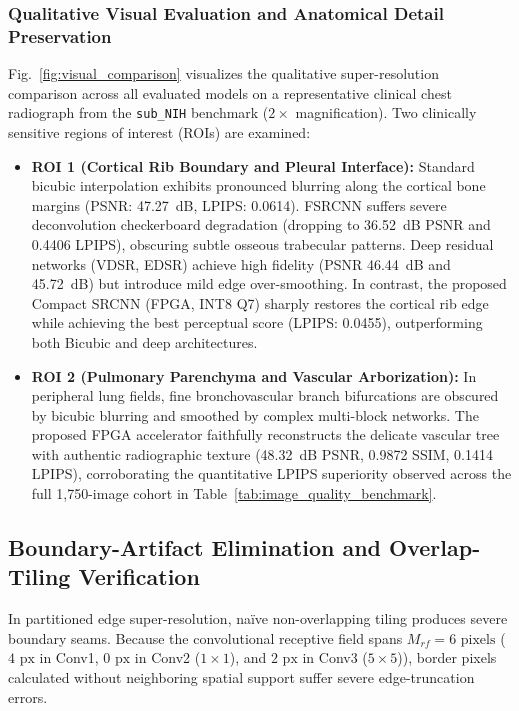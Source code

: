 \documentclass[conference]{IEEEtran}
\begin{document}
\subsubsection{Qualitative Visual Evaluation and Anatomical Detail Preservation}
Fig.~\ref{fig:visual_comparison} visualizes the qualitative super-resolution comparison across all evaluated models on a representative clinical chest radiograph from the \texttt{sub\_NIH} benchmark ($2\times$ magnification). Two clinically sensitive regions of interest (ROIs) are examined:
\begin{itemize}
    \item \textbf{ROI 1 (Cortical Rib Boundary and Pleural Interface):} Standard bicubic interpolation exhibits pronounced blurring along the cortical bone margins (PSNR: 47.27~dB, LPIPS: 0.0614). FSRCNN suffers severe deconvolution checkerboard degradation (dropping to 36.52~dB PSNR and 0.4406 LPIPS), obscuring subtle osseous trabecular patterns. Deep residual networks (VDSR, EDSR) achieve high fidelity (PSNR 46.44~dB and 45.72~dB) but introduce mild edge over-smoothing. In contrast, the proposed Compact SRCNN (FPGA, INT8 Q7) sharply restores the cortical rib edge while achieving the best perceptual score (LPIPS: 0.0455), outperforming both Bicubic and deep architectures.
    \item \textbf{ROI 2 (Pulmonary Parenchyma and Vascular Arborization):} In peripheral lung fields, fine bronchovascular branch bifurcations are obscured by bicubic blurring and smoothed by complex multi-block networks. The proposed FPGA accelerator faithfully reconstructs the delicate vascular tree with authentic radiographic texture (48.32~dB PSNR, 0.9872 SSIM, 0.1414 LPIPS), corroborating the quantitative LPIPS superiority observed across the full 1,750-image cohort in Table~\ref{tab:image_quality_benchmark}.
\end{itemize}

\subsection{Boundary-Artifact Elimination and Overlap-Tiling Verification}
\label{sec:tiling_verification}

In partitioned edge super-resolution, naïve non-overlapping tiling produces severe boundary seams. Because the convolutional receptive field spans $M_{rf} = 6\text{ pixels}$ ($4\text{ px}$ in Conv1, $0\text{ px}$ in Conv2 ($1\times 1$), and $2\text{ px}$ in Conv3 ($5\times 5$)), border pixels calculated without neighboring spatial support suffer severe edge-truncation errors.
\end{document}

